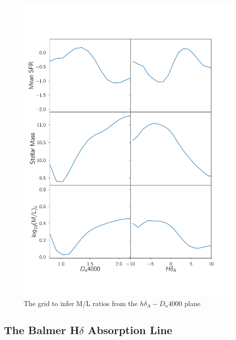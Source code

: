 \begin{figure}
\includegraphics[width=\textwidth]{figures/mass_age_sfr_dist.pdf}
\caption[The \citet{kauffmann_stellar_2003} grid to infer M/L ratios from the $h\delta_{A}-D_{n}4000$ plane]
{The \citet{kauffmann_stellar_2003} grid to infer M/L ratios from the $h\delta_{A}-D_{n}4000$ plane
\label{fig:kauff_grid}}
\end{figure}


\subsection{The Balmer H$\delta$ Absorption Line}
\label{hdelta}

